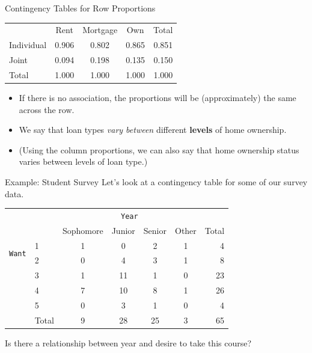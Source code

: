 \begin{frame}{Contingency Tables for Row Proportions}
    \begin{center}
        \begin{tabular}{l ccc r}
		& Rent & Mortgage & Own & Total  \\ 
        \cline{2-5}
        Individual & 0.906 & 0.802 & 0.865 & 0.851 \\ 
  		Joint & 0.094 & 0.198 & 0.135 & 0.150 \\ 
        \cline{2-5}
  		Total	& 1.000 & 1.000 & 1.000 & 1.000 \\
        \cline{2-5}
    \end{tabular}
    \end{center}
    \begin{itemize}
        \item If there is no association, the proportions will be (approximately) the same across the row.
        \item We say that loan types \textit{vary between} different \textbf{levels} of home ownership. 
        \item (Using the column proportions, we can also say that home ownership status varies between levels of loan type.)
    \end{itemize}
\end{frame}

\begin{frame}{Example: Student Survey}
    Let's look at a contingency table for some of our survey data.
    
    \begin{center}
        \begin{tabular}{r l cccc r}
		& & \multicolumn{4}{c}{{\texttt{Year}}} & \\
        \cline{3-6}
		& & Sophomore & Junior & Senior & Other & Total  \\ 
        \cline{2-7}
        \multirow{2}{*}{{\texttt{Want}}} 
        & 1 & 1 & 0 & 2 & 1 & 4 \\ 
  		& 2 & 0 & 4 & 3 & 1 & 8 \\ 
  		& 3 & 1 & 11 & 1 & 0 & 23 \\ 
  		& 4 & 7 & 10 & 8 & 1 & 26 \\ 
  		& 5 & 0 & 3 & 1 & 0 & 4 \\ 
        \cline{2-7}
  		& Total	& 9 & 28 & 25 & 3 & 65 \\
        \cline{2-7}
    \end{tabular}
    \end{center}
    
    Is there a relationship between year and desire to take this course?
\end{frame}


